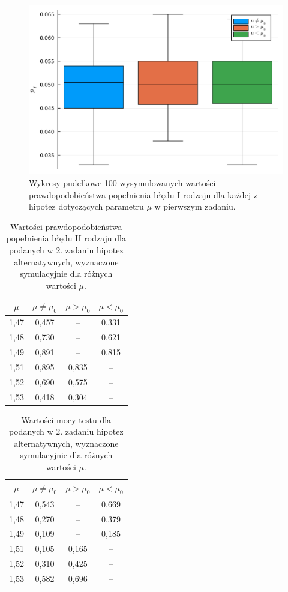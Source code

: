 \documentclass[12pt]{mwart}
\begin{document}
	\begin{figure}[H]
		\centering
		\includegraphics[scale=0.11]{images/boxplot_srednia.png}
		\caption{Wykresy pudełkowe 100 wysymulowanych wartości prawdopodobieństwa popełnienia błędu I rodzaju dla każdej z hipotez dotyczących parametru $\mu$ w pierwszym zadaniu.}
	\end{figure}

	\begin{table}[H]
		\centering
		\begin{tabular}{ |c|c|c|c| } 
			\hline
			\vphantom{ $1^{1^1}$} $\mu$ \vphantom{ $1^{1^{1^1}}$} & $\mu \neq \mu_0$ & $\mu > \mu_0$ & $\mu < \mu_0$ \\\hline
			1,47 & 0,457 & -- & 0,331 \\\hline
			1,48 & 0,730 & -- & 0,621 \\\hline
			1,49 & 0,891 & -- & 0,815 \\\hline
			1,51 & 0,895 & 0,835 & -- \\\hline
			1,52 & 0,690 & 0,575 & -- \\\hline
			1,53 & 0,418 & 0,304 & -- \\\hline
		\end{tabular}
		\caption{Wartości prawdopodobieństwa popełnienia błędu II rodzaju dla podanych w 2. zadaniu hipotez alternatywnych, wyznaczone symulacyjnie dla różnych wartości $\mu$.}
	\end{table}
	
	\begin{table}[H]
		\centering
		\begin{tabular}{ |c|c|c|c| } 
			\hline
			\vphantom{ $1^{1^1}$} $\mu$ \vphantom{ $1^{1^{1^1}}$} & $\mu \neq \mu_0$ & $\mu > \mu_0$ & $\mu < \mu_0$ \\\hline
			1,47 & 0,543 & -- & 0,669 \\\hline
			1,48 & 0,270 & -- & 0,379 \\\hline
			1,49 & 0,109 & -- & 0,185 \\\hline
			1,51 & 0,105 & 0,165 & -- \\\hline
			1,52 & 0,310 & 0,425 & -- \\\hline
			1,53 & 0,582 & 0,696 & -- \\\hline
		\end{tabular}
		\caption{Wartości mocy testu dla podanych w 2. zadaniu hipotez alternatywnych, wyznaczone symulacyjnie dla różnych wartości $\mu$.}
	\end{table}
	
\end{document}
